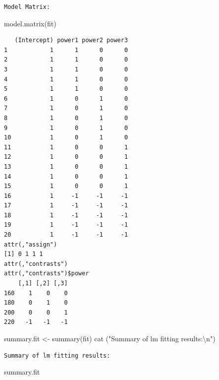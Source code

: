 \documentclass[
  letterpaper,
  DIV=11,
  numbers=noendperiod]{scrreprt}
\newenvironment{Shaded}{\begin{snugshade}}{\end{snugshade}}
\newcommand{\FunctionTok}[1]{\textcolor[rgb]{0.28,0.35,0.67}{#1}}
\newcommand{\NormalTok}[1]{\textcolor[rgb]{0.00,0.23,0.31}{#1}}
\newcommand{\OtherTok}[1]{\textcolor[rgb]{0.00,0.23,0.31}{#1}}
\newcommand{\SpecialCharTok}[1]{\textcolor[rgb]{0.37,0.37,0.37}{#1}}
\newcommand{\StringTok}[1]{\textcolor[rgb]{0.13,0.47,0.30}{#1}}
\begin{document}
\begin{verbatim}
Model Matrix:
\end{verbatim}

\begin{Shaded}
\begin{Highlighting}[]
\FunctionTok{model.matrix}\NormalTok{(fit)}
\end{Highlighting}
\end{Shaded}

\begin{verbatim}
   (Intercept) power1 power2 power3
1            1      1      0      0
2            1      1      0      0
3            1      1      0      0
4            1      1      0      0
5            1      1      0      0
6            1      0      1      0
7            1      0      1      0
8            1      0      1      0
9            1      0      1      0
10           1      0      1      0
11           1      0      0      1
12           1      0      0      1
13           1      0      0      1
14           1      0      0      1
15           1      0      0      1
16           1     -1     -1     -1
17           1     -1     -1     -1
18           1     -1     -1     -1
19           1     -1     -1     -1
20           1     -1     -1     -1
attr(,"assign")
[1] 0 1 1 1
attr(,"contrasts")
attr(,"contrasts")$power
    [,1] [,2] [,3]
160    1    0    0
180    0    1    0
200    0    0    1
220   -1   -1   -1
\end{verbatim}

\begin{Shaded}
\begin{Highlighting}[]
\NormalTok{summary.fit }\OtherTok{\textless{}{-}} \FunctionTok{summary}\NormalTok{(fit)}
\FunctionTok{cat}\NormalTok{ (}\StringTok{"Summary of lm fitting results:}\SpecialCharTok{\textbackslash{}n}\StringTok{"}\NormalTok{)}
\end{Highlighting}
\end{Shaded}

\begin{verbatim}
Summary of lm fitting results:
\end{verbatim}

\begin{Shaded}
\begin{Highlighting}[]
\NormalTok{summary.fit}
\end{Highlighting}
\end{Shaded}
\end{document}
